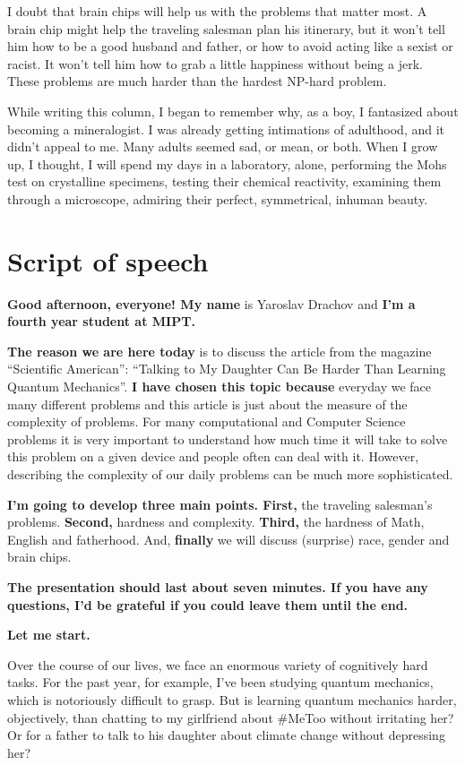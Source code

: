 \documentclass[a4paper]{article}
\renewcommand{\emph}{\textbf}
\begin{document}
I doubt that brain chips will help us with the problems that matter most. A brain chip might help the traveling salesman plan his itinerary, but it won’t tell him how to be a good husband and father, or how to avoid acting like a sexist or racist. It won’t tell him how to grab a little happiness without being a jerk. These problems are much harder than the hardest NP-hard problem.

While writing this column, I began to remember why, as a boy, I fantasized about becoming a mineralogist. I was already getting intimations of adulthood, and it didn’t appeal to me. Many adults seemed sad, or mean, or both. When I grow up, I thought, I will spend my days in a laboratory, alone, performing the Mohs test on crystalline specimens, testing their chemical reactivity, examining them through a microscope, admiring their perfect, symmetrical, inhuman beauty.
\section*{Script of speech}
	\noindent \textbf{Good afternoon, everyone! My name} is Yaroslav Drachov and \textbf{I’m a fourth year student at MIPT.}

\textbf{The reason we are here today} is to discuss the article from the magazine ``Scientific American'': ``Talking to My Daughter Can Be Harder Than Learning Quantum Mechanics''.\textbf{ I have chosen this topic because}
everyday we face many different problems and this article is just about the measure of the complexity of problems.
For many computational and Computer Science problems it
is very important to understand how much time
it will take to solve this problem on a given device and
people often can deal with it. However, describing the complexity 
of our daily problems can be much more sophisticated.

\emph{I'm going to develop three main points. First,}
the traveling salesman’s problems. \emph{Second, }hardness
and complexity. \emph{Third,} the hardness of Math, English and
fatherhood. And, \emph{finally}  we will discuss (surprise) race, gender and brain chips.

\emph{The presentation should last about seven minutes. If you have any questions, I’d be grateful if you could leave them until the end.}

\emph{Let me start.}

Over the course of our lives, we face an enormous variety of cognitively hard tasks. For the past year, for example, I’ve been studying quantum mechanics, which is notoriously difficult to grasp. But is learning quantum mechanics harder, objectively, than chatting to my girlfriend about \#MeToo without irritating her?
Or for a father to talk to his daughter about climate change without depressing her?
\end{document}
